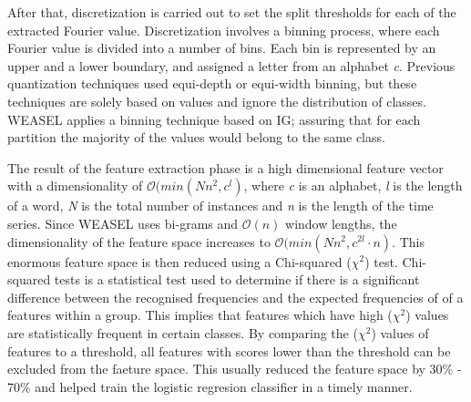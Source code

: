 After that, discretization is carried out to set the split thresholds for each of the extracted Fourier value.
Discretization involves a binning process, where each Fourier value is divided into a number of bins.
Each bin is represented by an upper and a lower boundary, and assigned a letter from an alphabet \emph{c}.
Previous quantization techniques used equi-depth or equi-width binning, but these techniques are solely based on values and ignore the distribution of classes.
WEASEL applies a binning technique based on IG; assuring that for each partition the majority of the values would belong to the same class.

The result of the feature extraction phase is a high dimensional feature vector with a dimensionality of \emph{$\mathcal{O}(min(Nn^{2},c^{l})$},
where \emph{c} is an alphabet, \emph{l} is the length of a word, \emph{N} is the total number of instances and \emph{n} is the length of the time series.
Since WEASEL uses bi-grams and \emph{$\mathcal{O}(n)$} window lengths, the dimensionality of the feature space increases to \emph{$\mathcal{O}(min(Nn^{2},c^{2l} \cdot n)$}.
This enormous feature space is then reduced using a Chi-squared ($\chi^{2}$) test. Chi-squared tests is a statistical test used to determine if there is a significant difference
between the recognised frequencies and the expected frequencies of of a features within a group. This implies that features which have high ($\chi^{2}$) values are statistically
frequent in certain classes. By comparing the ($\chi^{2}$) values of features to a threshold, all features with scores lower than the threshold can be excluded from the faeture space.
This usually reduced the feature space by 30\% - 70\% and helped train the logistic regresion classifier in a timely manner.

